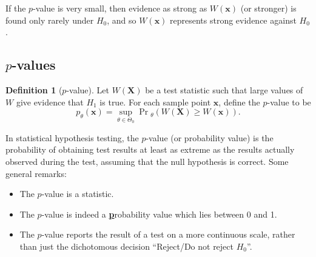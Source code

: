 \documentclass[
]{book}
\providecommand{\tightlist}{%
  \setlength{\itemsep}{0pt}\setlength{\parskip}{0pt}}
\newcommand{\bx}{{\boldsymbol x}}
\newcommand{\bX}{{\boldsymbol X}}
\theoremstyle{definition}
\newtheorem{definition}{Definition}[chapter]
\theoremstyle{definition}
\theoremstyle{definition}
\theoremstyle{definition}
\theoremstyle{remark}
\begin{document}
If the \(p\)-value is very small, then evidence as strong as \(W(\bx)\) (or stronger) is found only rarely under \(H_0\), and so \(W(\bx)\) represents strong evidence against \(H_0\).

\hypertarget{p-values}{%
\subsection{\texorpdfstring{\(p\)-values}{p-values}}\label{p-values}}

\begin{definition}[\(p\)-value]
\protect\hypertarget{def:pval}{}\label{def:pval}Let \(W(\bX)\) be a test statistic such that large values of \(W\) give evidence that \(H_1\) is true. For each sample point \(\bx\), define the \(p\)-value to be
\[
p_\theta(\bx) = \sup_{\theta\in\Theta_0} \Pr\!{}_\theta\left(W(\bX) \geq W(\bx) \right).
\]
\end{definition}

In statistical hypothesis testing, the \(p\)-value (or probability value) is the probability of obtaining test results at least as extreme as the results actually observed during the test, assuming that the null hypothesis is correct. Some general remarks:

\begin{itemize}
\tightlist
\item
  The \(p\)-value is a statistic.
\item
  The \(p\)-value is indeed a \uline{\textbf{p}}robability value which lies between 0 and 1.
\item
  The \(p\)-value reports the result of a test on a more continuous scale, rather than just the dichotomous decision ``Reject/Do not reject \(H_0\)''.
\end{itemize}
\end{document}
